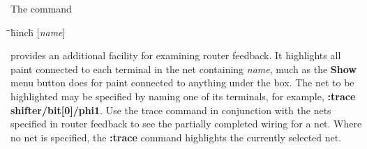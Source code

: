\documentclass[letterpaper,twoside,12pt]{article}
\def\hinch{\hspace*{0.5in}}
\def\starti{\begin{center}\begin{tabbing}\hinch\=\hinch\=\hinch\=hinch\hinch\=\kill}
\def\endi{\end{tabbing}\end{center}}
\def\ii{\>\>\>}
\begin{document}
The command

\starti
   \ii {\bfseries :trace} [{\itshape name}]
\endi

provides an additional facility for examining
router feedback.  It highlights all paint connected
to each terminal in the net containing {\itshape name},
much as the {\bfseries Show} menu button does for paint
connected to anything under the box.  The net to be highlighted
may be specified by naming one of its terminals, for example,
{\bfseries :trace shifter/bit[0]/phi1}.
Use the trace command in conjunction with the nets specified in
router feedback to see the partially completed wiring for a net.
Where no net is specified, the {\bfseries :trace} command highlights the
currently selected net.
\end{document}
